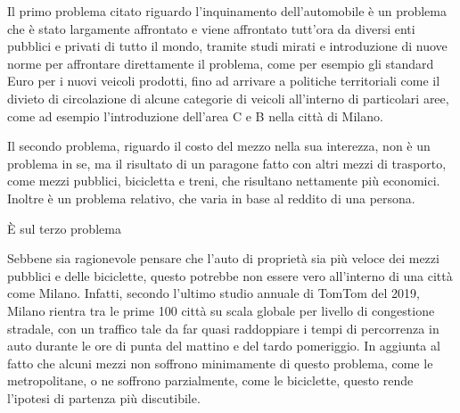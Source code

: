 Il primo problema citato riguardo l'inquinamento dell'automobile è un problema che è stato largamente affrontato e viene affrontato tutt'ora da diversi enti pubblici e privati di tutto il mondo, tramite studi mirati e introduzione di nuove norme per affrontare direttamente il problema, come per esempio gli standard Euro per i nuovi veicoli prodotti, fino ad arrivare a politiche territoriali come il divieto di circolazione di alcune categorie di veicoli all'interno di particolari aree, come ad esempio l'introduzione dell'area C e B nella città di Milano.

Il secondo problema, riguardo il costo del mezzo nella sua interezza, non è un problema in se, ma il risultato di un paragone fatto con altri mezzi di trasporto, come mezzi pubblici, bicicletta e treni, che risultano nettamente più economici. Inoltre è un problema relativo, che varia in base al reddito di una persona.

È sul terzo problema 

Sebbene sia ragionevole pensare che l'auto di proprietà sia più veloce dei mezzi pubblici e delle biciclette, questo potrebbe non essere vero all'interno di una città come Milano. Infatti, secondo l'ultimo studio annuale di TomTom del 2019\cite{tomtomindexmilan}, Milano rientra tra le prime 100 città su scala globale per livello di congestione stradale, con un traffico tale da far quasi raddoppiare i tempi di percorrenza in auto durante le ore di punta del mattino e del tardo pomeriggio. In aggiunta al fatto che alcuni mezzi non soffrono minimamente di questo problema, come le metropolitane, o ne soffrono parzialmente, come le biciclette, questo rende l'ipotesi di partenza più discutibile.